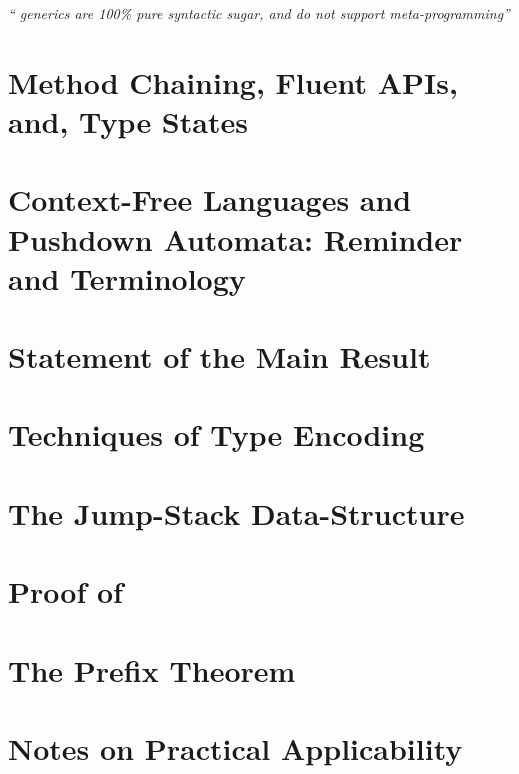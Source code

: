 \parbox{40ex}{%
  \begin{flushright}
    \scriptsize\itshape `` generics are 100\% pure syntactic sugar,
    and do not support meta-programming''\footnotemark
  \end{flushright}
}
\newline


\normalsize

\section{Method Chaining, Fluent APIs, and, Type States}
\label{Section:fluent}


\section{Context-Free Languages and Pushdown Automata: Reminder and Terminology}
\label{Section:pushdown}


\section{Statement of the Main Result} 
\label{Section:result}


\section{Techniques of Type Encoding}
\label{Section:toolkit}


\section{The Jump-Stack Data-Structure}
\label{Section:jump}


\section{Proof of }
\label{Section:proof}


\section{The Prefix Theorem}
\label{Section:prefix}


\section{Notes on Practical Applicability}
\label{Section:applicability}

